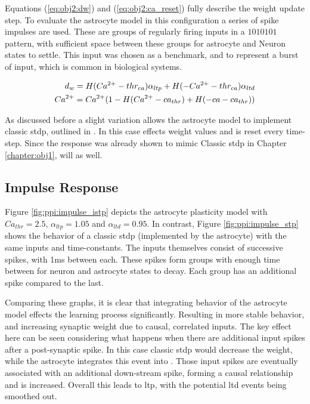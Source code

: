 Equations (\ref{eq:obj2:dw}) and (\ref{eq:obj2:ca_reset}) fully
describe the weight update step. To evaluate the astrocyte
model in this configuration a series of spike impulses are used. These are
groups of regularly firing inputs in a $1010101$ pattern, with sufficient space
between these groups for astrocyte and Neuron states to settle. This input was
chosen as a benchmark, and to represent a burst of input, which is common in
biological systems.

\begin{align}
  d_w = H(Ca^{2+} - thr_{ca}) \alpha_{ltp} + H(-Ca^{2+} - thr_{ca})
  \alpha_{ltd} \label{eq:obj2:dw} \\
  Ca^{2+} = Ca^{2+} (1 - H(Ca^{2+} - ca_{thr}) +  H(-ca - ca_{thr})) \label{eq:obj2:ca_reset}
\end{align}

As discussed before a slight variation allows the astrocyte model to implement
classic \gls{stdp}, outlined in . In this case \ca
effects weight values and is reset every time-step. Since the \ca response was
already shown to mimic Classic \gls{stdp} in Chapter \ref{chapter:obj1},
 will as well.

\subsection{Impulse Response}
Figure \ref{fig:ppi:impulse_istp} depicts the astrocyte plasticity model with
$Ca_{thr}=2.5$, $\alpha_{ltp}=1.05$ and $\alpha_{ltd}=0.95$. In contrast, Figure
\ref{fig:ppi:impulse_stp} shows the behavior of a classic \gls{stdp} (implemented by
the astrocyte) with the same inputs and time-constants. The inputs themselves
consist of successive spikes, with 1ms between each. These spikes form groups
with enough time between for neuron and astrocyte states to decay. Each group
has an additional spike compared to the last.

Comparing these graphs, it is clear that integrating
behavior of the astrocyte model effects the learning process
significantly. Resulting in more stable behavior, and increasing synaptic weight
due to causal, correlated inputs. The key effect here can be seen considering
what happens when there are additional input spikes after a post-synaptic
spike. In this case classic \gls{stdp} would decrease the weight, while the astrocyte
integrates this event into \ca. Those input spikes are eventually associated
with an additional down-stream spike, forming a causal relationship and \ca is
increased. Overall this leads to \gls{ltp}, with the potential \gls{ltd} events being
smoothed out.

